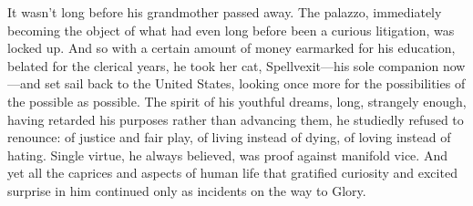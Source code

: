   It wasn’t long before his grandmother passed away. The palazzo, immediately
becoming the object of what had even long before been a curious litigation, was
locked up. And so with a certain amount of money earmarked for his education,
belated for the clerical years, he took her cat, Spellvexit—his sole companion
now—and set sail back to the United States, looking once more for the
possibilities of the possible as possible. The spirit of his youthful dreams,
long, strangely enough, having retarded his purposes rather than advancing them,
he studiedly refused to renounce: of justice and fair play, of living instead of
dying, of loving instead of hating. Single virtue, he always believed, was proof
against manifold vice. And yet all the caprices and aspects of human life that
gratified curiosity and excited surprise in him continued only as incidents on
the way to Glory.

